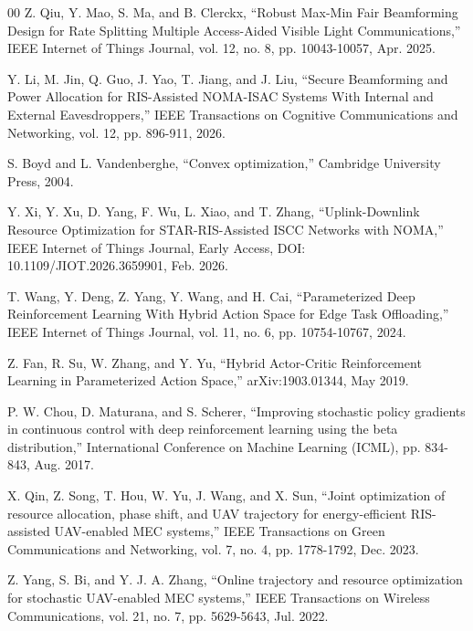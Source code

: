 \documentclass[10pt,journal,compsoc]{IEEEtran}
\begin{document}
\begin{thebibliography}{00}
Z. Qiu, Y. Mao, S. Ma, and B. Clerckx,
``Robust Max-Min Fair Beamforming Design for Rate Splitting Multiple Access-Aided Visible Light Communications,''
IEEE Internet of Things Journal, vol. 12, no. 8, pp. 10043-10057, Apr. 2025.

Y. Li, M. Jin, Q. Guo, J. Yao, T. Jiang, and J. Liu,
``Secure Beamforming and Power Allocation for RIS-Assisted NOMA-ISAC Systems With Internal and External Eavesdroppers,''
IEEE Transactions on Cognitive Communications and Networking, vol. 12, pp. 896-911, 2026.

S. Boyd and L. Vandenberghe, “Convex optimization,” Cambridge University Press, 2004.


Y. Xi, Y. Xu, D. Yang, F. Wu, L. Xiao, and T. Zhang, 
``Uplink-Downlink Resource Optimization for STAR-RIS-Assisted ISCC Networks with NOMA,'' 
IEEE Internet of Things Journal, Early Access, DOI: 10.1109/JIOT.2026.3659901, Feb. 2026.

T. Wang, Y. Deng, Z. Yang, Y. Wang, and H. Cai,
``Parameterized Deep Reinforcement Learning With Hybrid Action Space for Edge Task Offloading,''
IEEE Internet of Things Journal, vol. 11, no. 6, pp. 10754-10767, 2024.

Z. Fan, R. Su, W. Zhang, and Y. Yu,
``Hybrid Actor-Critic Reinforcement Learning in Parameterized Action Space,'' 
arXiv:1903.01344, May 2019.

P. W. Chou, D. Maturana, and S. Scherer, 
``Improving stochastic policy gradients in continuous control with deep reinforcement learning using the beta distribution,'' 
International Conference on Machine Learning (ICML), pp. 834-843, Aug. 2017.

X. Qin, Z. Song, T. Hou, W. Yu, J. Wang, and X. Sun, 
``Joint optimization of resource allocation, phase shift, and UAV trajectory for energy-efficient RIS-assisted UAV-enabled MEC systems,'' 
IEEE Transactions on Green Communications and Networking, vol. 7, no. 4, pp. 1778-1792, Dec. 2023.

Z. Yang, S. Bi, and Y. J. A. Zhang, 
``Online trajectory and resource optimization for stochastic UAV-enabled MEC systems,'' 
IEEE Transactions on Wireless Communications, vol. 21, no. 7, pp. 5629-5643, Jul. 2022.


\end{thebibliography}
\end{document}
